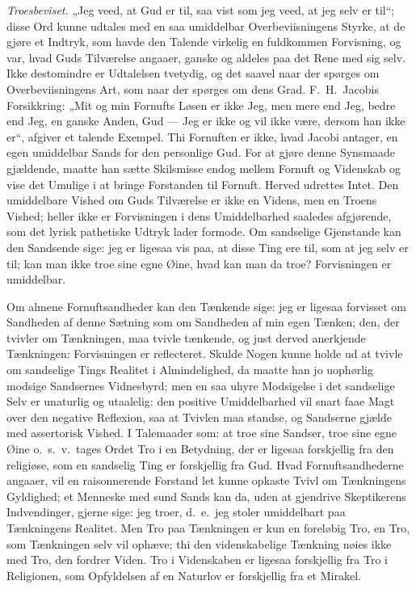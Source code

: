 \documentclass[12pt]{book}
\begin{document}
\emph{Troesbeviset.} „Jeg veed, at Gud er til, saa vist som jeg
veed, at jeg selv er til“; disse Ord kunne udtales med en saa
umiddelbar Overbeviisningens Styrke, at de gjøre et Indtryk, som
havde den Talende virkelig en fuldkommen Forvisning, og var, hvad
Guds Tilværelse angaaer, ganske og aldeles paa det Rene med sig
selv. Ikke destomindre er Udtalelsen tvetydig, og det saavel
naar der spørges om Overbeviisningens Art, som naar der spørges om
dens Grad. F.\ H.\ Jacobis Forsikkring: „Mit og min Fornufts Løsen
er ikke Jeg, men mere end Jeg, bedre end Jeg, en ganske Anden, Gud
--- Jeg er ikke og vil ikke være, dersom han ikke er“, afgiver et
talende Exempel. Thi Fornuften er ikke, hvad Jacobi antager, en egen
umiddelbar Sands for den personlige Gud. For at gjøre denne
Synsmaade gjældende, maatte han sætte Skilsmisse endog mellem
Fornuft og Videnskab og vise det Umulige i at bringe Forstanden til
Fornuft. Herved udrettes Intet. Den umiddelbare Vished om Guds
Tilværelse er ikke en Videns, men en Troens Vished; heller ikke er
Forvisningen i dens Umiddelbarhed saaledes afgjørende, som det
lyrisk pathetiske Udtryk lader formode. Om sandselige Gjenstande kan
den Sandsende sige: jeg er ligesaa vis paa, at disse Ting ere til,
som at jeg selv er til; kan man ikke troe sine egne Øine, hvad kan
man da troe? Forvisningen er umiddelbar.

Om almene Fornuftsandheder kan den Tænkende sige: jeg er ligesaa
forvisset om Sandheden af denne Sætning som om Sandheden af min egen
Tænken; den, der tvivler om Tænkningen, maa tvivle tænkende, og just
derved anerkjende Tænkningen: Forvisningen er reflecteret. Skulde
Nogen kunne holde ud at tvivle om sandselige Tings Realitet i
Almindelighed, da maatte han jo uophørlig modsige Sandsernes
Vidnesbyrd; men en saa uhyre Modsigelse i det sandselige Selv er
unaturlig og utaalelig: den positive Umiddelbarhed vil snart faae
Magt over den negative Reflexion, saa at Tvivlen maa standse, og
Sandserne gjælde med assertorisk Vished. I Talemaader som: at troe
sine Sandser, troe sine egne Øine o.\ s.\ v.\ tages Ordet Tro i en
Betydning, der er ligesaa forskjellig fra den religiøse, som en
sandselig Ting er forskjellig fra Gud. Hvad Fornuftsandhederne
angaaer, vil en raisonnerende Forstand let kunne opkaste Tvivl
om Tænkningens Gyldighed; et Menneske med sund Sands kan da, uden at
gjendrive Skeptikerens Indvendinger, gjerne sige: jeg troer, d.\ e.\
jeg stoler umiddelbart paa Tænkningens Realitet. Men Tro paa
Tænkningen er kun en foreløbig Tro, en Tro, som Tænkningen selv vil
ophæve; thi den videnskabelige Tænkning nøies ikke med Tro, den
fordrer Viden. Tro i Videnskaben er ligesaa forskjellig fra Tro i
Religionen, som Opfyldelsen af en Naturlov er forskjellig fra et
Mirakel.
\end{document}
